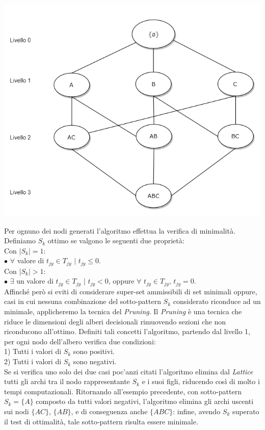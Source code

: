 \begin{center}
\includegraphics[scale = 0.60]{Immagini/Lattice.png}\\
\end{center}
Per ognuno dei nodi generati l'algoritmo effettua la verifica di minimalità. Definiamo $S_k$ ottimo se valgono le seguenti due proprietà:\\Con $|S_k| = 1$:\\$\bullet$ $\forall$ valore di $t_{jy} \in T_{jy}$ $|$ $t_{jy} \leq 0$.\\Con $|S_k| > 1$:\\ $\bullet$ $\exists$ un valore di $t_{jy} \in T_{jy}$ $|$ $t_{jy} < 0$, oppure $ \forall$  $t_{jy} \in T_{jy}$, $t_{jy}= 0 $.\\ Affinché però si eviti di considerare super-set ammissibili di set minimali oppure, casi in cui nessuna combinazione del sotto-pattern $S_k$ considerato riconduce ad un minimale, applicheremo la tecnica del \emph{Pruning}. Il \emph{Pruning} è una tecnica che riduce le dimensioni degli alberi decisionali rimuovendo sezioni che non riconducono all'ottimo. Definiti tali concetti l'algoritmo, partendo dal livello 1, per ogni nodo dell'albero verifica due condizioni:\\1) Tutti i valori di $S_k$ sono positivi.\\2) Tutti i valori di $S_k$ sono negativi.\\Se si verifica uno solo dei due casi poc'anzi citati l'algoritmo elimina dal \emph{Lattice} tutti gli archi tra il nodo rappresentante $S_k$ e i suoi figli, riducendo così di molto i tempi computazionali. Ritornando all'esempio precedente, con sotto-pattern $S_k = \{A\}$ composto da tutti valori negativi, l'algoritmo elimina gli archi uscenti sui nodi $\{AC\}$, $\{AB\}$, e di conseguenza anche $\{ABC\}$: infine, avendo $S_k$ superato il test di ottimalità, tale sotto-pattern risulta essere minimale.\\
